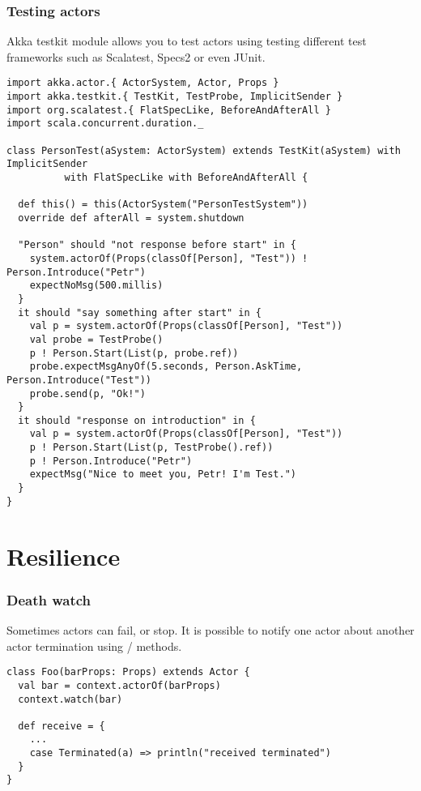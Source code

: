 \begin{frame}[fragile]
\frametitle{Testing actors}
  Akka testkit module allows you to test actors using testing different test frameworks
such as Scalatest, Specs2 or even JUnit.
\begin{lstlisting}
import akka.actor.{ ActorSystem, Actor, Props }
import akka.testkit.{ TestKit, TestProbe, ImplicitSender }
import org.scalatest.{ FlatSpecLike, BeforeAndAfterAll }
import scala.concurrent.duration._

class PersonTest(aSystem: ActorSystem) extends TestKit(aSystem) with ImplicitSender
          with FlatSpecLike with BeforeAndAfterAll {

  def this() = this(ActorSystem("PersonTestSystem"))
  override def afterAll = system.shutdown

  "Person" should "not response before start" in {
    system.actorOf(Props(classOf[Person], "Test")) ! Person.Introduce("Petr")
    expectNoMsg(500.millis)
  }
  it should "say something after start" in {
    val p = system.actorOf(Props(classOf[Person], "Test"))
    val probe = TestProbe()
    p ! Person.Start(List(p, probe.ref))
    probe.expectMsgAnyOf(5.seconds, Person.AskTime, Person.Introduce("Test"))
    probe.send(p, "Ok!")
  }
  it should "response on introduction" in {
    val p = system.actorOf(Props(classOf[Person], "Test"))
    p ! Person.Start(List(p, TestProbe().ref))
    p ! Person.Introduce("Petr")
    expectMsg("Nice to meet you, Petr! I'm Test.")
  }
}
\end{lstlisting}
\end{frame}

\section{Resilience}

\begin{frame}[fragile]
\frametitle{Death watch}
Sometimes actors can fail, or stop. It is possible to notify one actor about another actor
termination using  /  methods.
\begin{lstlisting}
class Foo(barProps: Props) extends Actor {
  val bar = context.actorOf(barProps)
  context.watch(bar)

  def receive = {
    ...
    case Terminated(a) => println("received terminated")
  }
}
\end{lstlisting}
\end{frame}

